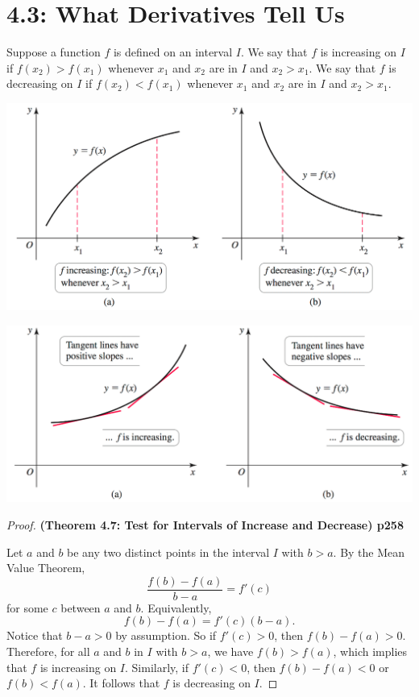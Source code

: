 \documentclass[answers]{exam}
\begin{document}
\section{4.3: What Derivatives Tell Us}
\begin{defn*}
  Suppose a function $f$ is defined on an interval $I$. We say that $f$ is increasing on $I$ if $f(x_2)>f(x_1)$ whenever $x_1$ and $x_2$ are in $I$ and $x_2>x_1$. We say that $f$ is decreasing on $I$ if $f(x_2)<f(x_1)$ whenever $x_1$ and $x_2$ are in $I$ and $x_2>x_1$.
\end{defn*}
\begin{center}
  \includegraphics[width=0.65\linewidth]{images/briggs_04_03/fig4_20.png}
\end{center}

\noindent
{}
\begin{center}
  \includegraphics[width=0.65\linewidth]{images/briggs_04_03/fig4_21.png}
\end{center}
\pagebreak
\begin{proof}
  \textbf{(Theorem 4.7: Test for Intervals of Increase and Decrease) p258}

  Let $a$ and $b$ be any two distinct points in the interval $I$ with $b>a$. By the Mean Value Theorem, 
    $$\frac{f(b)-f(a)}{b-a}=f'(c)$$
  for some $c$ between $a$ and $b$. Equivalently,
    $$f(b)-f(a)=f'(c)(b-a).$$
  Notice that $b-a>0$ by assumption. So if $f'(c)>0$, then $f(b)-f(a)>0$. Therefore, for all $a$ and $b$ in $I$ with $b>a$, we have $f(b)>f(a)$, which implies that $f$ is increasing on $I$. Similarly, if $f'(c)<0$, then $f(b)-f(a)<0$ or $f(b)<f(a)$. It follows that $f$ is decreasing on $I$.
\end{proof}
\end{document}
